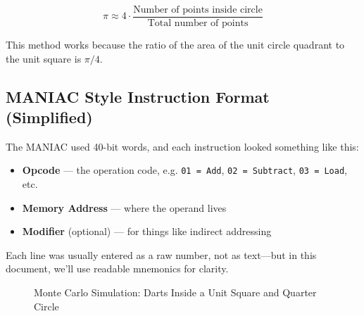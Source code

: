     \[
    \pi \approx 4 \cdot \frac{\text{Number of points inside circle}}{\text{Total number of points}}
    \]
    
    This method works because the ratio of the area of the unit circle quadrant to the unit square is \( \pi/4 \).
    
    \subsection{MANIAC Style Instruction Format (Simplified)}
    
    The MANIAC used 40-bit words, and each instruction looked something like this:
    
    \begin{itemize}
        \item \textbf{Opcode} — the operation code, e.g. \texttt{01 = Add}, \texttt{02 = Subtract}, \texttt{03 = Load}, etc.
        \item \textbf{Memory Address} — where the operand lives
        \item \textbf{Modifier} (optional) — for things like indirect addressing
    \end{itemize}
    
    Each line was usually entered as a raw number, not as text—but in this document, we'll use readable mnemonics for clarity.
    


    \begin{figure}[H]
      \centering
      \caption{Monte Carlo Simulation: Darts Inside a Unit Square and Quarter Circle}
      \label{fig:montecarlo_quartercircle}
      \end{figure}


